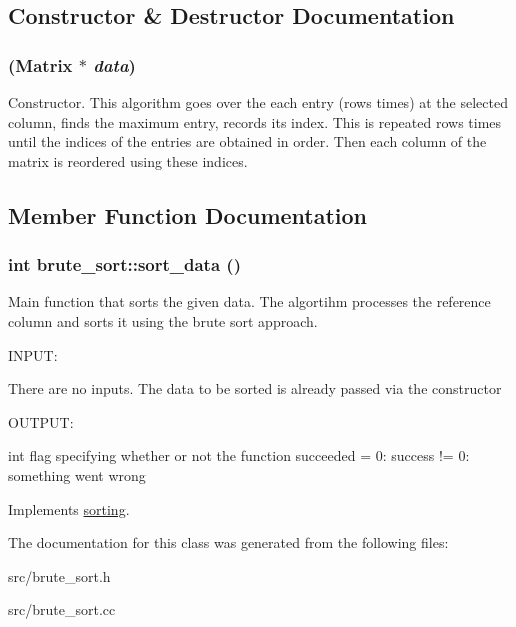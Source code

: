 \subsection{Constructor \& Destructor Documentation}
\hypertarget{classbrute__sort_a2dbbb3b1c89d6a5720d79a5bf150ad1f}{
\subsubsection[{brute\_\-sort}]{ ({\bf Matrix} $\ast$ {\em data})}}
\label{d3/d39/classbrute__sort_a2dbbb3b1c89d6a5720d79a5bf150ad1f}


Constructor. This algorithm goes over the each entry (rows times) at the selected column, finds the maximum entry, records its index. This is repeated rows times until the indices of the entries are obtained in order. Then each column of the matrix is reordered using these indices. 

\subsection{Member Function Documentation}
\hypertarget{classbrute__sort_a377b8811e92553a66cdb6780c43e16e6}{
\subsubsection[{sort\_\-data}]{\setlength{\rightskip}{0pt plus 5cm}int brute\_\-sort::sort\_\-data ()}}
\label{d3/d39/classbrute__sort_a377b8811e92553a66cdb6780c43e16e6}


Main function that sorts the given data. The algortihm processes the reference column and sorts it using the brute sort approach.

\begin{DoxyVerb}
  INPUT:

  There are no inputs. The data to be sorted is already passed via the constructor

  
  OUTPUT:

  int          flag specifying whether or not the function succeeded
                = 0: success
	       != 0: something went wrong

  \end{DoxyVerb}
 

Implements \hyperlink{classsorting_a94c4b729732743299f3dcd2505312381}{sorting}.

The documentation for this class was generated from the following files:\begin{DoxyCompactItemize}
\item 
src/brute\_\-sort.h\item 
src/brute\_\-sort.cc\end{DoxyCompactItemize}
